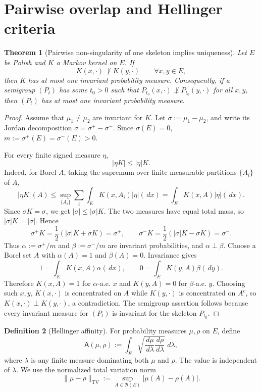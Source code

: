 \documentclass[12pt]{article}
\newcommand{\1}{\mathbf 1}
\newcommand{\dd}{\,d}
\newcommand{\TV}{\mathrm{TV}}
\newcommand{\Aff}{\mathsf A}
\newcommand{\cB}{\mathcal B}
\theoremstyle{plain}
\newtheorem{theorem}{Theorem}[section]
\theoremstyle{definition}
\newtheorem{definition}[theorem]{Definition}
\theoremstyle{remark}
\numberwithin{equation}{section}
\begin{document}
\section{Pairwise overlap and Hellinger criteria}

\begin{theorem}[Pairwise non-singularity of one skeleton implies uniqueness]\label{thm:pairwise}
Let \(E\) be Polish and \(K\) a Markov kernel on \(E\).  If
\[
K(x,\cdot)\not\perp K(y,\cdot)\qquad\forall x,y\in E,
\]
then \(K\) has at most one invariant probability measure.  Consequently, if a
semigroup \((P_t)\) has some \(t_0>0\) such that
\(P_{t_0}(x,\cdot)\not\perp P_{t_0}(y,\cdot)\) for all \(x,y\), then
\((P_t)\) has at most one invariant probability measure.
\end{theorem}

\begin{proof}
Assume that \(\mu_1\ne\mu_2\) are invariant for \(K\).  Let
\(\sigma:=\mu_1-\mu_2\), and write its Jordan decomposition
\(\sigma=\sigma^+-\sigma^-\).  Since \(\sigma(E)=0\),
\(m:=\sigma^+(E)=\sigma^-(E)>0\).

For every finite signed measure \(\eta\),
\[
|\eta K|\le |\eta|K.
\]
Indeed, for Borel \(A\), taking the supremum over finite measurable partitions
\(\{A_i\}\) of \(A\),
\[
|\eta K|(A)
\le
\sup_{\{A_i\}}\sum_i\int_EK(x,A_i)|\eta|(\dd x)
=
\int_EK(x,A)|\eta|(\dd x).
\]
Since \(\sigma K=\sigma\), we get \(|\sigma|\le|\sigma|K\).  The two measures
have equal total mass, so \(|\sigma|K=|\sigma|\).  Hence
\[
\sigma^+K=\frac12(|\sigma|K+\sigma K)=\sigma^+,
\qquad
\sigma^-K=\frac12(|\sigma|K-\sigma K)=\sigma^-.
\]
Thus \(\alpha:=\sigma^+/m\) and \(\beta:=\sigma^-/m\) are invariant
probabilities, and \(\alpha\perp\beta\).  Choose a Borel set \(A\) with
\(\alpha(A)=1\) and \(\beta(A)=0\).  Invariance gives
\[
1=\int_EK(x,A)\alpha(\dd x),\qquad
0=\int_EK(y,A)\beta(\dd y).
\]
Therefore \(K(x,A)=1\) for \(\alpha\)-a.e. \(x\) and \(K(y,A)=0\) for
\(\beta\)-a.e. \(y\).  Choosing such \(x,y\), \(K(x,\cdot)\) is concentrated on
\(A\) while \(K(y,\cdot)\) is concentrated on \(A^c\), so
\(K(x,\cdot)\perp K(y,\cdot)\), a contradiction.  The semigroup assertion
follows because every invariant measure for \((P_t)\) is invariant for the
skeleton \(P_{t_0}\).
\end{proof}

\begin{definition}[Hellinger affinity]
For probability measures \(\mu,\rho\) on \(E\), define
\[
\Aff(\mu,\rho)
:=
\int_E\sqrt{\frac{\dd\mu}{\dd\lambda}\frac{\dd\rho}{\dd\lambda}}\,\dd\lambda,
\]
where \(\lambda\) is any finite measure dominating both \(\mu\) and \(\rho\).
The value is independent of \(\lambda\).  We use the normalized total variation
norm
\[
\|\mu-\rho\|_{\TV}:=\sup_{A\in\cB(E)}|\mu(A)-\rho(A)|.
\]
\end{definition}
\end{document}
